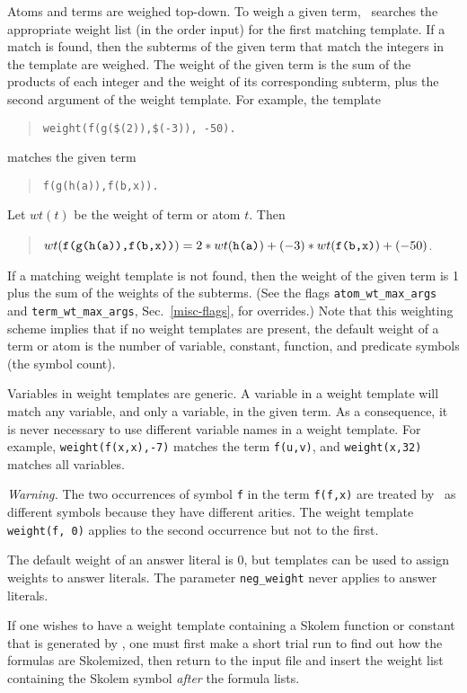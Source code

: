 \documentclass[11pt]{article}
\begin{document}
Atoms and terms are weighed top-down.  To weigh a given term, \otter\
searches the appropriate weight list (in the order input)
for the first matching template.  If a match is found, then the
subterms of the given term that match the integers in the template are
weighed.  The weight of the given term is the sum of the products of
each integer and the weight of its corresponding subterm, plus the
second argument of the weight template.  For example, the template
\begin{verse}
\verb:weight(f(g($(2)),$(-3)), -50).:
\end{verse}
matches the given term
\begin{verse}
\verb:f(g(h(a)),f(b,x)).:
\end{verse}
Let $wt(t)$ be the weight of term or atom $t$. Then
\begin{verse}
$wt(\mbox{\tt f(g(h(a)),f(b,x))}) = 2*wt(\mbox{\tt h(a)}) + (-3)*wt(\mbox{\tt f(b,x)}) + (-50)$.
\end{verse}
If a matching weight
template is not found, then the weight of the given term is 1 plus the sum of
the weights of the subterms.  (See the flags \verb:atom_wt_max_args:
and \verb:term_wt_max_args:, Sec.~\ref{misc-flags}, for overrides.)
Note that this weighting scheme implies that if no weight templates
are present, the default weight of a term or atom is the number of
variable, constant, function, and predicate symbols (the symbol count).

Variables in weight templates are generic.
A variable in a weight template will match any variable, and only a variable,
in the given term.
As a consequence, it is never necessary to use different variable names
in a weight template.
For example, \verb:weight(f(x,x),-7): matches the term \verb:f(u,v):,
and \verb:weight(x,32): matches all variables.



{\em Warning.} The two occurrences of symbol \verb:f: in the term
\verb:f(f,x): are treated by \otter\ as different symbols because they
have different arities.  The weight template \verb:weight(f, 0):
applies to the second occurrence but not to the first.

The default weight of an answer literal is 0, but templates can
be used to assign weights to answer literals.  The parameter
\verb:neg_weight: never applies to answer literals.

If one wishes to have a weight template containing a Skolem function or
constant that is generated by \otter, one must first make a short
trial run to find out how the formulas are Skolemized, then return
to the input file and insert the weight list containing the
Skolem symbol {\it after} the formula lists.
\end{document}
